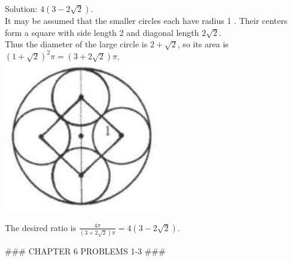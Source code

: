 \documentclass[10pt]{article}
\begin{document}
Solution: \(4(3-2 \sqrt{2})\).\\
It may be assumed that the smaller circles each have radius 1 . Their centers form a square with side length 2 and diagonal length \(2 \sqrt{2}\).\\
Thus the diameter of the large circle is \(2+\sqrt{2}\), so its area is \((1+\sqrt{2})^{2} \pi=(3+2 \sqrt{2}) \pi\).\\
\includegraphics[max width=\textwidth, center]{2025_04_17_97bc1f7e44d93c271a88g-182(2)}


The desired ratio is \(\frac{4 \pi}{(3+2 \sqrt{2}) \pi}=4(3-2 \sqrt{2})\).


### CHAPTER 6 PROBLEMS 1-3 ###
\end{document}
